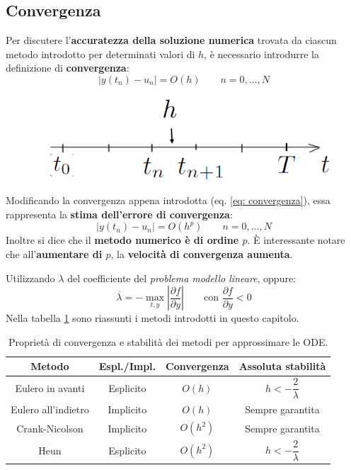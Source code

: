 \subsection{Convergenza}

Per discutere l'\textbf{accuratezza della soluzione numerica} trovata da ciascun metodo introdotto per determinati valori di $h$, è necessario introdurre la definizione di \textbf{convergenza}:
\begin{equation}\label{eq: convergenza}
	\left|y\left(t_{n}\right) - u_{n}\right| = O\left(h\right) \hspace{2em} n = 0, \dots, N
\end{equation}
\begin{figure}[!htp]
	\centering
	\includegraphics[width=.4\textwidth]{img/convergenza-1.png}
\end{figure}

\noindent
Modificando la convergenza appena introdotta (eq. \ref{eq: convergenza}), essa rappresenta la \textbf{stima dell'errore di convergenza}:
\begin{equation}
	\left|y\left(t_{n}\right) - u_{n}\right| = O\left(h^{p}\right) \hspace{2em} n = 0, \dots, N
\end{equation}
Inoltre si dice che il \textbf{metodo numerico è di ordine $p$}. È interessante notare che all'\textbf{aumentare di $p$}, la \textbf{velocità di convergenza aumenta}.

\highspace
Utilizzando $\lambda$ del coefficiente del \emph{problema modello lineare}, oppure:
\begin{equation*}
	\overline{\lambda} = -\underset{t,y}{\max} \left|\dfrac{\partial f}{\partial y}\right| \hspace{2em} \text{con } \dfrac{\partial f}{\partial y} < 0
\end{equation*}
Nella tabella \ref{table: convergenza e stabilità} sono riassunti i metodi introdotti in questo capitolo.

\begin{table}[!htp]
	\centering
	\begin{tabular}{@{} c c c c @{}}
		\toprule
		\textbf{Metodo} & \textbf{Espl./Impl.} & \textbf{Convergenza} & \textbf{Assoluta stabilità} \\
		\midrule
		Eulero in avanti & Esplicito & $O\left(h\right)$ & $h < -\dfrac{2}{\lambda}$ \\
		\cmidrule{1-4}
		Eulero all'indietro & Implicito & $O\left(h\right)$ & Sempre garantita \\
		\cmidrule{1-4}
		Crank-Nicolson & Implicito & $O\left(h^{2}\right)$ & Sempre garantita \\
		\cmidrule{1-4}
		Heun & Esplicito & $O\left(h^{2}\right)$ & $h < -\dfrac{2}{\lambda}$ \\
		\bottomrule
	\end{tabular}
	\caption{Proprietà di convergenza e stabilità dei metodi per approssimare le ODE.}
	\label{table: convergenza e stabilità}
\end{table}

